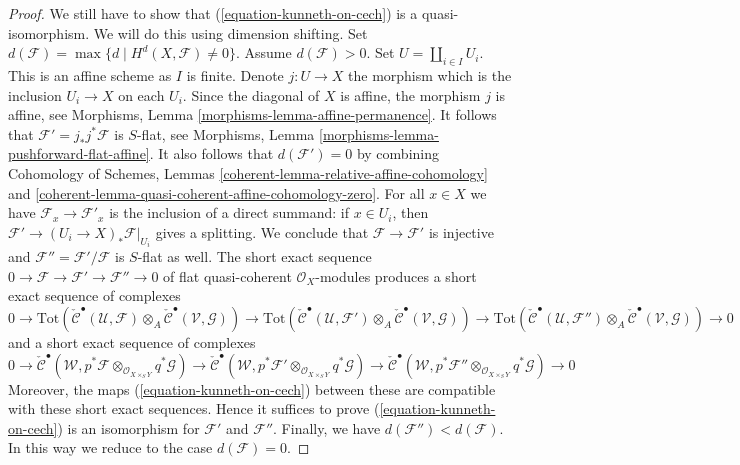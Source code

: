 \begin{proof}
\medskip\noindent
We still have to show that (\ref{equation-kunneth-on-cech})
is a quasi-isomorphism. We will do this using dimension shifting.
Set $d(\mathcal{F}) = \max \{d \mid H^d(X, \mathcal{F}) \not = 0\}$.
Assume $d(\mathcal{F}) > 0$. Set $U = \coprod\nolimits_{i \in I} U_i$.
This is an affine scheme as $I$ is finite. Denote
$j : U \to X$ the morphism which is the inclusion $U_i \to X$
on each $U_i$. Since the diagonal of $X$ is affine, the morphism
$j$ is affine, see
Morphisms, Lemma \ref{morphisms-lemma-affine-permanence}.
It follows that $\mathcal{F}' = j_*j^*\mathcal{F}$ is $S$-flat, see
Morphisms, Lemma \ref{morphisms-lemma-pushforward-flat-affine}.
It also follows that $d(\mathcal{F}') = 0$ by combining
Cohomology of Schemes, Lemmas
\ref{coherent-lemma-relative-affine-cohomology} and
\ref{coherent-lemma-quasi-coherent-affine-cohomology-zero}.
For all $x \in X$ we have $\mathcal{F}_x  \to \mathcal{F}'_x$
is the inclusion of a direct summand: if $x \in U_i$,
then $\mathcal{F}' \to (U_i \to X)_*\mathcal{F}|_{U_i}$
gives a splitting. We conclude that
$\mathcal{F} \to \mathcal{F}'$ is injective and
$\mathcal{F}'' = \mathcal{F}'/\mathcal{F}$
is $S$-flat as well. The short exact sequence
$0 \to \mathcal{F} \to \mathcal{F}' \to \mathcal{F}'' \to 0$
of flat quasi-coherent $\mathcal{O}_X$-modules
produces a short exact sequence of complexes
$$
0 \to
\text{Tot}(
\check{\mathcal{C}}^\bullet(\mathcal{U}, \mathcal{F})
\otimes_A
\check{\mathcal{C}}^\bullet(\mathcal{V}, \mathcal{G})) \to
\text{Tot}(
\check{\mathcal{C}}^\bullet(\mathcal{U}, \mathcal{F}')
\otimes_A
\check{\mathcal{C}}^\bullet(\mathcal{V}, \mathcal{G})) \to
\text{Tot}(
\check{\mathcal{C}}^\bullet(\mathcal{U}, \mathcal{F}'')
\otimes_A
\check{\mathcal{C}}^\bullet(\mathcal{V}, \mathcal{G})) \to 0
$$
and a short exact sequence of complexes
$$
0 \to
\check{\mathcal{C}}^\bullet(\mathcal{W},
p^*\mathcal{F}
\otimes_{\mathcal{O}_{X \times_S Y}}
q^*\mathcal{G}) \to
\check{\mathcal{C}}^\bullet(\mathcal{W},
p^*\mathcal{F}'
\otimes_{\mathcal{O}_{X \times_S Y}}
q^*\mathcal{G}) \to
\check{\mathcal{C}}^\bullet(\mathcal{W},
p^*\mathcal{F}''
\otimes_{\mathcal{O}_{X \times_S Y}}
q^*\mathcal{G}) \to 0
$$
Moreover, the maps (\ref{equation-kunneth-on-cech}) between these are
compatible with these short exact sequences. Hence it suffices to prove
(\ref{equation-kunneth-on-cech})
is an isomorphism for $\mathcal{F}'$ and $\mathcal{F}''$. Finally,
we have $d(\mathcal{F}'') < d(\mathcal{F})$.
In this way we reduce to the case $d(\mathcal{F}) = 0$.


\end{proof}
